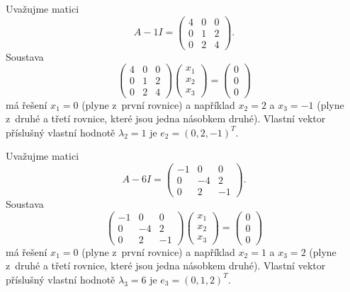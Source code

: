 Uvažujme matici
\begin{equation*}
  A-1 I=
  \begin{pmatrix}
    4 & 0 & 0\\
    0 & 1 & 2\\
    0 & 2& 4
  \end{pmatrix}.
\end{equation*}
Soustava
\begin{equation*}
  \begin{pmatrix}
    4 & 0 & 0\\
    0 & 1 & 2\\
    0 & 2& 4
  \end{pmatrix}
  \begin{pmatrix}
    x_1\\x_2\\x_3
  \end{pmatrix}
  =
  \begin{pmatrix}
    0 \\0\\0
  \end{pmatrix}
\end{equation*}
má řešení $x_1=0$ (plyne z první rovnice) a například $x_2=2$ a $x_3=-1$ (plyne z druhé a třetí rovnice, které jsou jedna násobkem druhé). Vlastní vektor příslušný vlastní hodnotě $\lambda_2=1$ je $e_2=(0,2,-1)^T$.

Uvažujme matici
\begin{equation*}
  A-6 I=
  \begin{pmatrix}
    -1 & 0 & 0\\
    0 & -4 & 2\\
    0 & 2& -1
  \end{pmatrix}.
\end{equation*}
Soustava
\begin{equation*}
  \begin{pmatrix}
    -1 & 0 & 0\\
    0 & -4 & 2\\
    0 & 2& -1
  \end{pmatrix}
  \begin{pmatrix}
    x_1\\x_2\\x_3
  \end{pmatrix}
  =
  \begin{pmatrix}
    0 \\0\\0
  \end{pmatrix}
\end{equation*}
má řešení $x_1=0$ (plyne z první rovnice) a například $x_2=1$ a $x_3=2$ (plyne z druhé a třetí rovnice, které jsou jedna násobkem druhé). Vlastní vektor příslušný vlastní hodnotě $\lambda_3=6$ je $e_3=(0,1,2)^T$.

